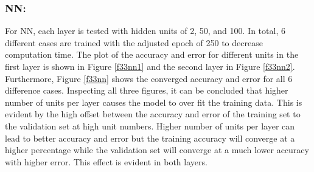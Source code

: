 \documentclass[12pt]{article}
\begin{document}
\subsubsection{NN:}
For NN, each layer is tested with hidden units of 2, 50, and 100. In total, 6 different cases are trained with the adjusted epoch of 250 to decrease computation time. The plot of the accuracy and error for different units in the first layer is shown in Figure \ref{f33nn1} and the second layer in Figure \ref{f33nn2}. Furthermore, Figure \ref{f33nn} shows the converged accuracy and error for all 6 difference cases. Inspecting all three figures, it can be concluded that higher number of units per layer causes the model to over fit the training data. This is evident by the high offset between the accuracy and error of the training set to the validation set at high unit numbers. Higher number of units per layer can lead to better accuracy and error but the training accuracy will converge at a higher percentage while the validation set will converge at a much lower accuracy with higher error. This effect is evident in both layers.
\end{document}
